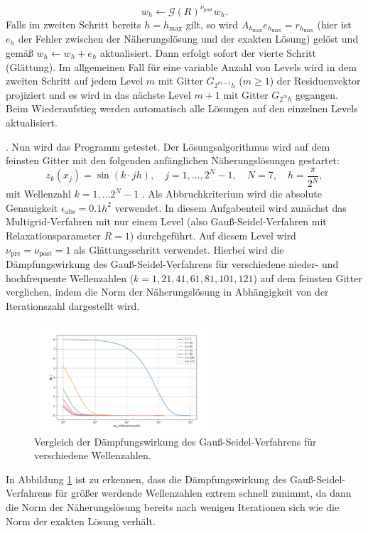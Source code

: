\documentclass[11pt,a4paper]{article}
\begin{document}
\begin{equation*}
    w_h \leftarrow \mathcal{G}(R)^{\nu_{\mathrm{post}}} w_h .
\end{equation*} Falls im zweiten Schritt bereits $h = h_{\mathrm{max}}$ gilt, so wird $A_{h_{\mathrm{max}}} e_{h_{\mathrm{max}}} = r_{h_{\mathrm{max}}}$ (hier ist $e_h$ der Fehler zwischen der Näherungslösung und der exakten Lösung) gelöst und gemäß $w_h \leftarrow w_h + e_h$ aktualisiert. Dann erfolgt sofort der vierte Schritt (Glättung).
Im allgemeinen Fall für eine variable Anzahl von Levels wird in dem zweiten Schritt auf jedem Level $m$ mit Gitter $G_{2^{m-1}h}$ ($m \geq 1$) der Residuenvektor projiziert und es wird in das nächste Level
$m+1$ mit Gitter $G_{2^m h}$ gegangen. Beim Wiederaufstieg werden automatisch alle Lösungen auf den einzelnen Levels aktualisiert.\newpage

. Nun wird das Programm getestet. Der Lösungsalgorithmus wird auf dem feinsten Gitter mit den folgenden anfänglichen Näherungslösungen gestartet:
\begin{equation*}
    z_k(x_j) = \sin{(k \cdot j h)} , \quad j = 1 , \dots , 2^N - 1 , \quad N = 7 , \quad h = \frac{\pi}{2^N} ,
\end{equation*} mit Wellenzahl $k = 1 , \dots 2^N - 1$ . Als Abbruchkriterium wird die absolute Genauigkeit $\epsilon_{\mathrm{abs}} = 0.1 h^2$ verwendet. In diesem Aufgabenteil wird zunächst das Multigrid-Verfahren mit nur einem Level (also Gauß-Seidel-Verfahren mit Relaxationsparameter $R=1$) durchgeführt.
Auf diesem Level wird $\nu_{\mathrm{pre}} = \nu_{\mathrm{post}} = 1$ als Glättungsschritt verwendet. Hierbei wird die Dämpfungswirkung des Gauß-Seidel-Verfahrens für verschiedene nieder- und hochfrequente Wellenzahlen ($k = 1, 21, 41, 61, 81, 101, 121$) auf dem feinsten Gitter verglichen,
indem die Norm der Näherungslösung in Abhängigkeit von der Iterationszahl dargestellt wird.
\begin{figure}[htbp]
    \centering
    \includegraphics[width=0.6\textwidth,scale=0.7]{h1_comparison_plot_1}
    \caption[Vergleich der Dämpfungswirkung des Gauß-Seidel-Verfahrens für verschiedene Wellenzahlen.]{Vergleich der Dämpfungswirkung des Gauß-Seidel-Verfahrens für verschiedene Wellenzahlen.}\label{fig:h1_comparison_plot_1}
\end{figure} In Abbildung \ref{fig:h1_comparison_plot_1} ist zu erkennen, dass die Dämpfungswirkung des Gauß-Seidel-Verfahrens für größer werdende Wellenzahlen extrem schnell zunimmt, da dann die Norm der Näherungslösung bereits nach wenigen Iterationen sich wie die Norm der exakten Lösung verhält.\newline
\end{document}
